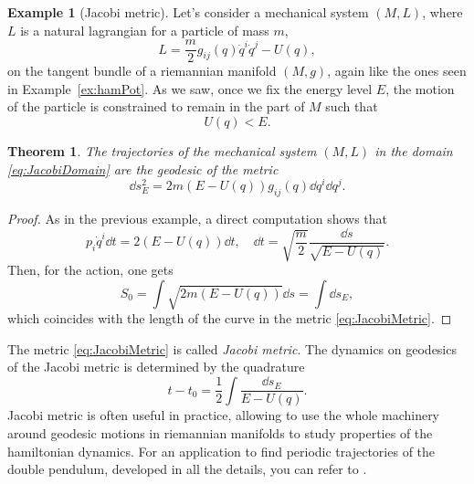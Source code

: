 \documentclass[english,fontsize=11pt,paper=b5]{scrbook}
\newtheorem{theorem}{Theorem}[chapter]
\theoremstyle{definition}
\newtheorem{example}{Example}[chapter]
\begin{document}
    \begin{example}[Jacobi metric]
      Let's consider a mechanical system $(M,L)$, where $L$ is a natural lagrangian for a particle of mass $m$,
      \begin{equation}
        L = \frac m2 g_{ij}(q) \dot q^i \dot q^j - U(q),
      \end{equation}
      on the tangent bundle of a riemannian manifold $(M,g)$, again like the ones seen in Example~\ref{ex:hamPot}.
      As we saw, once we fix the energy level $E$, the motion of the particle is constrained to remain in the part of $M$ such that
      \begin{equation}\label{eq:JacobiDomain}
        U(q) < E.
      \end{equation}

      \begin{theorem}
        The trajectories of the mechanical system $(M,L)$ in the domain \eqref{eq:JacobiDomain} are the geodesic of the metric
        \begin{equation}\label{eq:JacobiMetric}
          \dd s^2_E = 2m (E-U(q)) g_{ij}(q)\dd q^i \dd q^j.
        \end{equation}
      \end{theorem}
      \begin{proof}
        As in the previous example, a direct computation shows that
        \begin{equation}
          p_i \dot q^i \dd t = 2 (E-U(q)) \dd t, \quad
          \dd t = \sqrt{\frac{m}{2}} \frac{\dd s}{\sqrt{E-U(q)}}.
        \end{equation}
        Then, for the action, one gets
        \begin{equation}
          S_0 = \int \sqrt{2m(E-U(q))}\dd s = \int \dd s_E,
        \end{equation}
        which coincides with the length of the curve in the metric \eqref{eq:JacobiMetric}.
      \end{proof}

      The metric \eqref{eq:JacobiMetric} is called \emph{Jacobi metric}.
      The dynamics on geodesics of the Jacobi metric is determined by the quadrature
      \begin{equation}
        t - t_0 = \frac12 \int \frac{\dd s_E}{E-U(q)}.
      \end{equation}
      Jacobi metric is often useful in practice, allowing to use the whole machinery around geodesic motions in riemannian manifolds to study properties of the hamiltonian dynamics.
      For an application to find periodic trajectories of the double pendulum, developed in all the details, you can refer to \cite[Example 8.32]{book:knauf}.
    \end{example}
\end{document}
